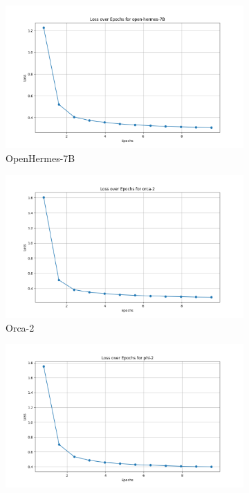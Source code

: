 \begin{figure}[ht]
\begin{subfigure}{0.33\textwidth}
		\includegraphics[width=1.0\textwidth]{Immagini/train_loss/open-hermes-7B-loss_plot.png}
		\caption{OpenHermes-7B}
	\end{subfigure}
  	\begin{subfigure}{0.33\textwidth}
		\includegraphics[width=1.0\textwidth]{Immagini/train_loss/orca-2-loss_plot.png}
		\caption{Orca-2}
	\end{subfigure}%
	\begin{subfigure}{0.33\textwidth}
		\includegraphics[width=1.0\textwidth]{Immagini/train_loss/phi-2-loss_plot.png}

\end{subfigure}
\end{figure}
